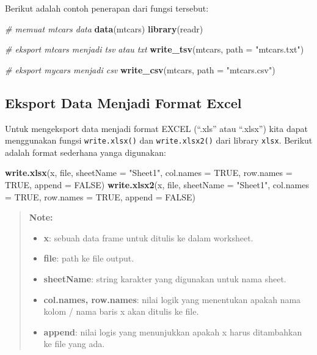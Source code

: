 \documentclass[]{book}
\newenvironment{Shaded}{\begin{snugshade}}{\end{snugshade}}
\newcommand{\KeywordTok}[1]{\textcolor[rgb]{0.13,0.29,0.53}{\textbf{#1}}}
\newcommand{\DataTypeTok}[1]{\textcolor[rgb]{0.13,0.29,0.53}{#1}}
\newcommand{\StringTok}[1]{\textcolor[rgb]{0.31,0.60,0.02}{#1}}
\newcommand{\CommentTok}[1]{\textcolor[rgb]{0.56,0.35,0.01}{\textit{#1}}}
\newcommand{\OtherTok}[1]{\textcolor[rgb]{0.56,0.35,0.01}{#1}}
\newcommand{\NormalTok}[1]{#1}
\providecommand{\tightlist}{%
  \setlength{\itemsep}{0pt}\setlength{\parskip}{0pt}}
\begin{document}
Berikut adalah contoh penerapan dari fungsi tersebut:

\begin{Shaded}
\begin{Highlighting}[]
\CommentTok{# memuat mtcars data}
\KeywordTok{data}\NormalTok{(mtcars)}
\KeywordTok{library}\NormalTok{(readr)}

\CommentTok{# eksport mtcars menjadi tsv atau txt}
\KeywordTok{write_tsv}\NormalTok{(mtcars, }\DataTypeTok{path =} \StringTok{"mtcars.txt"}\NormalTok{)}

\CommentTok{# eksport mycars menjadi csv}
\KeywordTok{write_csv}\NormalTok{(mtcars, }\DataTypeTok{path =} \StringTok{"mtcars.csv"}\NormalTok{)}
\end{Highlighting}
\end{Shaded}

\subsection{Eksport Data Menjadi Format
Excel}\label{eksport-data-menjadi-format-excel}

Untuk mengeksport data menjadi format EXCEL (``.xls'' atau ``.xlsx'')
kita dapat menggunakan fungsi \texttt{write.xlsx()} dan
\texttt{write.xlsx2()} dari library \texttt{xlsx}. Berikut adalah format
sederhana yanga digunakan:

\begin{Shaded}
\begin{Highlighting}[]
\KeywordTok{write.xlsx}\NormalTok{(x, file, }\DataTypeTok{sheetName =} \StringTok{"Sheet1"}\NormalTok{, }
  \DataTypeTok{col.names =} \OtherTok{TRUE}\NormalTok{, }\DataTypeTok{row.names =} \OtherTok{TRUE}\NormalTok{, }\DataTypeTok{append =} \OtherTok{FALSE}\NormalTok{)}
\KeywordTok{write.xlsx2}\NormalTok{(x, file, }\DataTypeTok{sheetName =} \StringTok{"Sheet1"}\NormalTok{,}
  \DataTypeTok{col.names =} \OtherTok{TRUE}\NormalTok{, }\DataTypeTok{row.names =} \OtherTok{TRUE}\NormalTok{, }\DataTypeTok{append =} \OtherTok{FALSE}\NormalTok{)}
\end{Highlighting}
\end{Shaded}

\begin{quote}
\textbf{Note: }

\begin{itemize}
\tightlist
\item
  \textbf{x}: sebuah data frame untuk ditulis ke dalam worksheet.
\item
  \textbf{file}: path ke file output.
\item
  \textbf{sheetName}: string karakter yang digunakan untuk nama sheet.
\item
  \textbf{col.names, row.names}: nilai logik yang menentukan apakah nama
  kolom / nama baris x akan ditulis ke file.
\item
  \textbf{append}: nilai logis yang menunjukkan apakah x harus
  ditambahkan ke file yang ada.
\end{itemize}
\end{quote}
\end{document}
